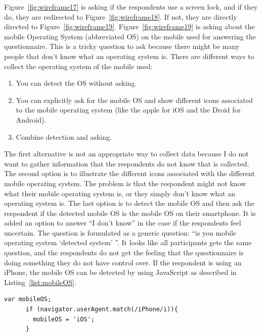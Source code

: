     Figure~\ref{fig:wireframe17} is asking if the respondents use a screen lock, and if they do, they are redirected to Figure~\ref{fig:wireframe18}. If not, they are directly directed to Figure~\ref{fig:wireframe19}. Figure~\ref{fig:wireframe19} is asking about the mobile Operating System (abbreviated OS) on the mobile used for answering the questionnaire. This is a tricky question to ask because there might be many people that don't know what an operating system is. There are different ways to collect the operating system of the mobile used:

      \begin{enumerate}
        \item You can detect the OS without asking.
        \item You can explicitly ask for the mobile OS and show different icons associated to the mobile operating system (like the apple for iOS and the Droid for Android). 
        \item Combine detection and asking. 
      \end{enumerate}

    The first alternative is not an appropriate way to collect data because I do not want to gather information that the respondents do not know that is collected. The second option is to illustrate the different icons associated with the different mobile operating system. The problem is that the respondent might not know what their mobile operating system is, or they simply don't know what an operating system is. The last option is to detect the mobile OS and then ask the respondent if the detected mobile OS is the mobile OS on their smartphone. It is added an option to answer ``I don't know'' in the case if the respondents feel uncertain. The question is formulated as a generic question: ``is you mobile operating system `detected system' ''. It looks like all participants gets the same question, and the respondents do not get the feeling that the questionnaire is doing something they do not have control over. If the respondent is using an iPhone, the mobile OS can be detected by using JavaScript as described in Listing~\ref{list:mobileOS}.

    \clearpage
    \medskip
    \begin{lstlisting}[caption=Detecting mobile OS, label=list:mobileOS]
      var mobileOS;
      if (navigator.userAgent.match(/iPhone/i)){
        mobileOS = 'iOS';
      }
    \end{lstlisting}

